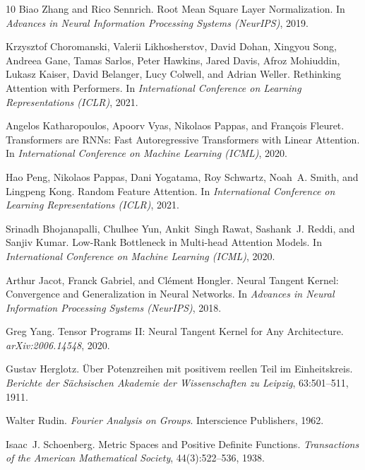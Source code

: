 \documentclass[11pt]{article}
\theoremstyle{definition}
\begin{document}
\begin{thebibliography}{10}
Biao Zhang and Rico Sennrich.
\newblock Root Mean Square Layer Normalization.
\newblock In \emph{Advances in Neural Information Processing Systems (NeurIPS)}, 2019.

Krzysztof Choromanski, Valerii Likhosherstov, David Dohan, Xingyou Song,
  Andreea Gane, Tamas Sarlos, Peter Hawkins, Jared Davis, Afroz Mohiuddin,
  Lukasz Kaiser, David Belanger, Lucy Colwell, and Adrian Weller.
\newblock Rethinking Attention with Performers.
\newblock In \emph{International Conference on Learning Representations (ICLR)}, 2021.

Angelos Katharopoulos, Apoorv Vyas, Nikolaos Pappas, and Fran\c{c}ois Fleuret.
\newblock Transformers are RNNs: Fast Autoregressive Transformers with Linear Attention.
\newblock In \emph{International Conference on Machine Learning (ICML)}, 2020.

Hao Peng, Nikolaos Pappas, Dani Yogatama, Roy Schwartz, Noah~A. Smith, and Lingpeng Kong.
\newblock Random Feature Attention.
\newblock In \emph{International Conference on Learning Representations (ICLR)}, 2021.

Srinadh Bhojanapalli, Chulhee Yun, Ankit~Singh Rawat, Sashank~J. Reddi, and Sanjiv Kumar.
\newblock Low-Rank Bottleneck in Multi-head Attention Models.
\newblock In \emph{International Conference on Machine Learning (ICML)}, 2020.

Arthur Jacot, Franck Gabriel, and Cl\'ement Hongler.
\newblock Neural Tangent Kernel: Convergence and Generalization in Neural Networks.
\newblock In \emph{Advances in Neural Information Processing Systems (NeurIPS)}, 2018.

Greg Yang.
\newblock Tensor Programs {II}: Neural Tangent Kernel for Any Architecture.
\newblock \emph{arXiv:2006.14548}, 2020.

Gustav Herglotz.
\newblock \"{U}ber Potenzreihen mit positivem reellen Teil im Einheitskreis.
\newblock \emph{Berichte der S\"{a}chsischen Akademie der Wissenschaften zu Leipzig}, 63:501--511, 1911.

Walter Rudin.
\newblock \emph{Fourier Analysis on Groups}.
\newblock Interscience Publishers, 1962.

Isaac~J. Schoenberg.
\newblock Metric Spaces and Positive Definite Functions.
\newblock \emph{Transactions of the American Mathematical Society}, 44(3):522--536, 1938.


\end{thebibliography}
\end{document}

